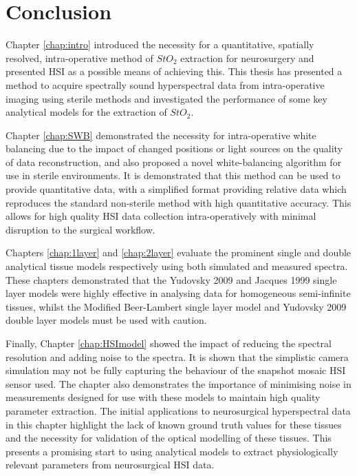 \chapter{Conclusion}
\label{chap:conclusion}
\minitoc

Chapter \ref{chap:intro} introduced the necessity for a quantitative, spatially resolved, intra-operative method of $StO_2$ extraction for neurosurgery and presented HSI as a possible means of achieving this. This thesis has presented a method to acquire spectrally sound hyperspectral data from intra-operative imaging using sterile methods and investigated the performance of some key analytical models for the extraction of $StO_2$. 

Chapter \ref{chap:SWB} demonstrated the necessity for intra-operative white balancing due to the impact of changed positions or light sources on the quality of data reconstruction, and also proposed a novel white-balancing algorithm for use in sterile environments. It is demonstrated that this method can be used to provide quantitative data, with a simplified format providing relative data which reproduces the standard non-sterile method with high quantitative accuracy. This allows for high quality HSI data collection intra-operatively with minimal disruption to the surgical workflow. 

Chapters \ref{chap:1layer} and \ref{chap:2layer} evaluate the prominent single and double analytical tissue models respectively using both simulated and measured spectra. These chapters demonstrated that the Yudovsky 2009 and Jacques 1999 single layer models were highly effective in analysing data for homogeneous semi-infinite tissues, whilst the Modified Beer-Lambert single layer model and Yudovsky 2009 double layer models must be used with caution. 

Finally, Chapter \ref{chap:HSImodel} showed the impact of reducing the spectral resolution and adding noise to the spectra. It is shown that the simplistic camera simulation may not be fully capturing the behaviour of the snapshot mosaic HSI sensor used. The chapter also demonstrates the importance of minimising noise in measurements designed for use with these models to maintain high quality parameter extraction. The initial applications to neurosurgical hyperspectral data in this chapter highlight the lack of known ground truth values for these tissues and the necessity for validation of the optical modelling of these tissues. This presents a promising start to using analytical models to extract physiologically relevant parameters from neurosurgical HSI data. 

